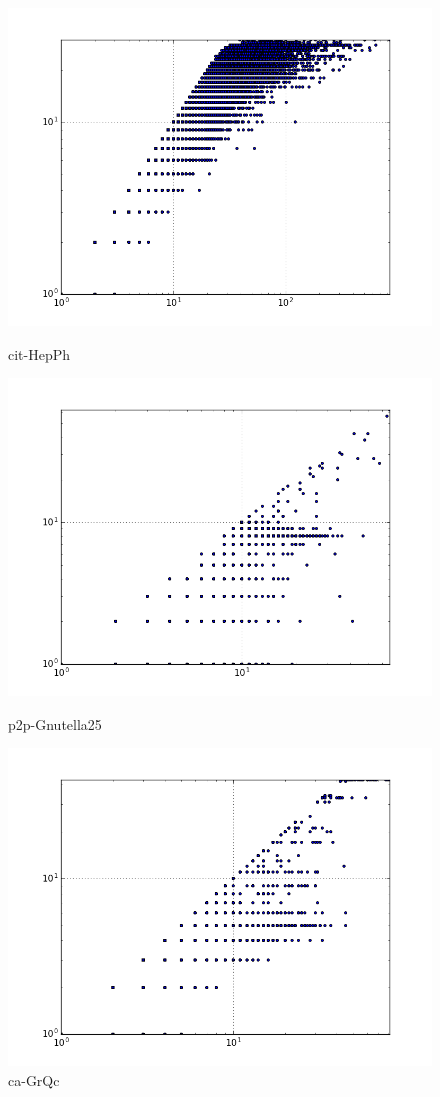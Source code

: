 \begin{figure}[H]
  \includegraphics[width=\linewidth]{img/cit-HepPh/degreeVSkcore.png}
  \caption*{cit-HepPh}
\endminipage\hfill
{}
  \includegraphics[width=\linewidth]{img/p2p-Gnutella25/degreeVSkcore.png}
  \caption*{p2p-Gnutella25}
\endminipage\hfill
{}
  \includegraphics[width=\linewidth]{img/ca-GrQc/degreeVSkcore.png}
  \caption*{ca-GrQc}
\endminipage
\end{figure}
